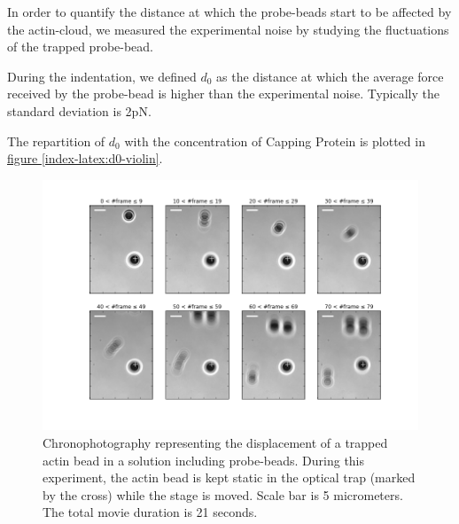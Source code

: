 \documentclass[A4paperpaper,11pt,english]{sphinxmanual}
\begin{document}
In order to quantify the distance at which the probe-beads start to be affected by the actin-cloud,
we measured the experimental noise by studying the fluctuations of the trapped probe-bead.

During the indentation, we defined \(d_0\) as the distance at which the
average force received by the probe-bead is higher than the experimental noise.
Typically the standard deviation is 2pN.

The repartition of \(d_0\) with the concentration of Capping Protein is
plotted in \hyperref[index-latex:d0-violin]{figure  \ref*{index-latex:d0-violin}}.
\begin{figure}[htbp]
\centering
\capstart

\includegraphics[width=0.850\linewidth]{cloud-repelling.png}
\caption{Chronophotography representing the displacement of a trapped actin bead in a
solution including probe-beads. During this experiment, the actin bead is kept
static in the optical trap (marked by the cross) while the stage is moved.
Scale bar is 5 micrometers. The total movie duration is 21 seconds.}\label{index-latex:cloud-repelling}\end{figure}
\end{document}
